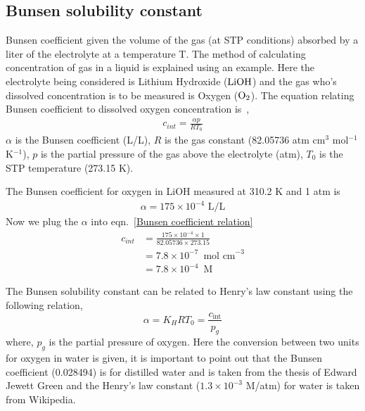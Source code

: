 \documentclass[12pt]{book}
\begin{document}
\subsection{Bunsen solubility constant}
\label{Bunsen solubility section}
Bunsen coefficient given the volume of the gas (at STP conditions) absorbed by a liter of the electrolyte at a temperature T.
The method of calculating concentration of gas in a liquid is explained using an example. Here the electrolyte being considered is Lithium Hydroxide ($\ce{LiOH}$) and the gas who's dissolved concentration is to be measured is Oxygen ($\ce{O2}$). The equation relating Bunsen coefficient to dissolved oxygen concentration is~\cite{Breitbarth2004},
\begin{align}
c_{int} = \frac{\alpha p}{R T_0}
\label{Bunsen coefficient relation}
\end{align}  
$\alpha$ is the Bunsen coefficient (L/L), $R$ is the gas constant (82.05736 atm cm$^3$ mol$^{-1}$ K$^{-1}$), $p$ is the partial pressure of the gas above the electrolyte (atm), $T_0$ is the STP temperature (273.15 K).

The Bunsen coefficient for oxygen in  LiOH measured at 310.2 K and 1 atm is
\begin{align}
\alpha = 175\times 10^{-4}\,\,\textrm{L/L}
\end{align} 
Now we plug the $\alpha$ into eqn.~\ref{Bunsen coefficient relation}
\begin{align}
c_{int} &= \frac{175\times 10^{-4}\times 1}{82.05736\times 273.15}\nonumber\\
&= 7.8\times 10^{-7}\,\,\,\textrm{mol cm}^{-3}\nonumber\\
&= 7.8\times 10^{-4}\,\,\,\textrm{M}\nonumber
\end{align}

The Bunsen solubility constant can be related to Henry's law constant using the following relation,
\begin{equation}
\alpha = K_HRT_0  =  \frac{c_\textrm{int}}{p_g}
\end{equation}
where, $p_g$ is the partial pressure of oxygen. Here the conversion between two units for oxygen in water is given, it is important to point out that the Bunsen coefficient (0.028494) is for distilled water and is taken from the thesis of Edward Jewett Green and the Henry's law constant ($1.3\times 10^{-3}$ M/atm) for water is taken from Wikipedia. 
 
\end{document}
